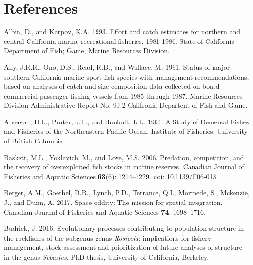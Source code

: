 \documentclass[11pt,
  english,
]{article}
\newlength{\cslhangindent}
\newenvironment{CSLReferences}[2] %
 {%
  \setlength{\parindent}{0pt}
  \ifodd #1 \everypar{\setlength{\hangindent}{\cslhangindent}}\ignorespaces\fi
  \ifnum #2 > 0
  \setlength{\parskip}{#2\baselineskip}
  \fi
 }%
 {}
\begin{document}
\clearpage

\clearpage


\hypertarget{references}{%
\section*{References}\label{references}}

\leavevmode\tagmcend\tagstructend

\thispagestyle{empty}

\hypertarget{refs}{}
\begin{CSLReferences}{1}{0}
\leavevmode{}%
Albin, D., and Karpov, K.A. 1993. {Effort and catch estimates for northern and central California marine recreational fisheries, 1981-1986}. State of California Department of Fish; Game, Marine Resources Division.

\leavevmode{}%
Ally, J.R.R., Ono, D.S., Read, R.B., and Wallace, M. 1991. {Status of major southern California marine sport fish species with management recommendations, based on analyses of catch and size composition data collected on board commercial passenger fishing vessels from 1985 through 1987}. Marine Resources Division Administrative Report No. 90-2 Califronia Departent of Fish and Game.

\leavevmode{}%
Alverson, D.L., Pruter, a.T., and Ronholt, L.L. 1964. {A Study of Demersal Fishes and Fisheries of the Northeastern Pacific Ocean}. Institute of Fisheries, University of British Columbia.

\leavevmode{}%
Baskett, M.L., Yoklavich, M., and Love, M.S. 2006. {Predation, competition, and the recovery of overexploited fish stocks in marine reserves}. Canadian Journal of Fisheries and Aquatic Sciences \textbf{63}(6): 1214--1229. doi: \href{https://doi.org/10.1139/F06-013}{10.1139/F06-013}.

\leavevmode{}%
Berger, A.M., Goethel, D.R., Lynch, P.D., Terrance, Q.I., Mormede, S., Mckenzie, J., and Dunn, A. 2017. {Space oddity: The mission for spatial integration}. Canadian Journal of Fisheries and Aquatic Sciences \textbf{74}: 1698--1716.

\leavevmode{}%
Budrick, J. 2016. {Evolutionary processes contributing to population structure in the rockfishes of the subgenus genus \emph{Rosicola}: implications for fishery management, stock assessment and prioritization of future analyses of structure in the genus \emph{Sebastes}.} PhD thesis, University of California, Berkeley.


\end{CSLReferences}
\end{document}
